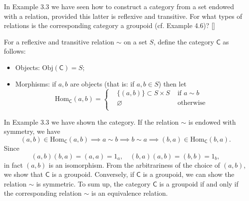 \documentclass[12pt,letterpaper,boxed]{hmcpset}
\begin{document}
\begin{problem}[4.2]
	In Example 3.3 we have seen how to construct a category from a set endowed	with a relation, provided this latter is reflexive and transitive. For what types of relations is the corresponding category a groupoid (cf. Example 4.6)? []
\end{problem}
\begin{solution}
	For a reflexive and transitive relation $\sim$ on a set $S$, define the category $\mathsf{C}$ as follows:
	\begin{itemize}
		\item Objects: $\mathrm{Obj}(\mathsf{C})=S$;
		\item Morphisms: if $a, b$ are objects (that is: if $a, b \in S$) then let 
		\[
		\mathrm{Hom}_\mathsf{C}(a, b)=
		\left\{
		\begin{aligned}
		& \big\{ (a, b) \big\} \subset S\times S &\text{ if } a\sim b\\	
		& \varnothing &\text{ otherwise}\\
		\end{aligned}
		\right.
		\]
	\end{itemize}
	In Example 3.3 we have shown the category. If the relation $\sim$ is endowed with symmetry, we have
	\[
	(a,b)\in\mathrm{Hom}_\mathsf{C}(a, b)\implies a\sim b\implies b\sim a\implies (b,a)\in\mathrm{Hom}_\mathsf{C}(b, a).
	\]
	Since
	\[
	(a,b)(b, a)=(a,a)=1_a,\quad(b, a)(a,b)=(b,b)=1_b,
	\]
	in fact $(a,b)$ is an isomorphism. From the arbitrariness of the choice of $(a,b)$, we show that $\mathsf{C}$ is a groupoid. Conversely, if $\mathsf{C}$ is a groupoid, we can show the relation $\sim$ is symmetric. To sum up, the category $\mathsf{C}$ is a groupoid
	if and only if the corresponding relation $\sim$ is an equivalence relation.
\end{solution}
\end{document}
